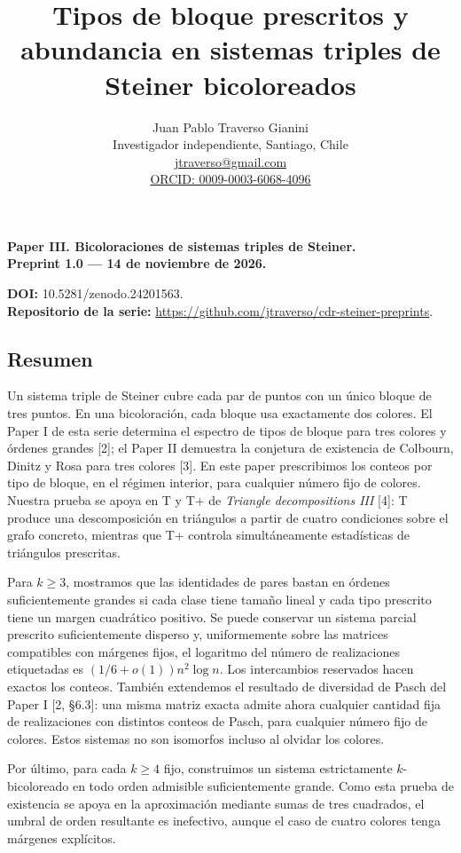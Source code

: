 \documentclass[spanish,11pt,a4paper]{article}
\title{Tipos de bloque prescritos y abundancia en sistemas triples de Steiner bicoloreados}
\author{Juan Pablo Traverso Gianini\\\small Investigador independiente, Santiago, Chile\\\small \href{mailto:jtraverso@gmail.com}{jtraverso@gmail.com}\\\small \href{https://orcid.org/0009-0003-6068-4096}{ORCID: 0009-0003-6068-4096}}
\date{}
\begin{document}
\raggedbottom\maketitle
\textbf{Paper III. Bicoloraciones de sistemas triples de Steiner.}\\
\textbf{Preprint 1.0 --- 14 de noviembre de 2026.}

\textbf{DOI:} 10.5281/zenodo.24201563.\\
\textbf{Repositorio de la serie:} \url{https://github.com/jtraverso/cdr-steiner-preprints}.

\subsection{Resumen}\label{resumen}

Un sistema triple de Steiner cubre cada par de puntos con un único bloque de tres puntos. En una bicoloración, cada bloque usa exactamente dos colores. El Paper I de esta serie determina el espectro de tipos de bloque para tres colores y órdenes grandes {[}2{]}; el Paper II demuestra la conjetura de existencia de Colbourn, Dinitz y Rosa para tres colores {[}3{]}. En este paper prescribimos los conteos por tipo de bloque, en el régimen interior, para cualquier número fijo de colores. Nuestra prueba se apoya en T y T+ de \emph{Triangle decompositions III} {[}4{]}: T produce una descomposición en triángulos a partir de cuatro condiciones sobre el grafo concreto, mientras que T+ controla simultáneamente estadísticas de triángulos prescritas.

Para \(k\ge3\), mostramos que las identidades de pares bastan en órdenes suficientemente grandes si cada clase tiene tamaño lineal y cada tipo prescrito tiene un margen cuadrático positivo. Se puede conservar un sistema parcial prescrito suficientemente disperso y, uniformemente sobre las matrices compatibles con márgenes fijos, el logaritmo del número de realizaciones etiquetadas es \((1/6+o(1))n^2\log n\). Los intercambios reservados hacen exactos los conteos. También extendemos el resultado de diversidad de Pasch del Paper I {[}2, §6.3{]}: una misma matriz exacta admite ahora cualquier cantidad fija de realizaciones con distintos conteos de Pasch, para cualquier número fijo de colores. Estos sistemas no son isomorfos incluso al olvidar los colores.

Por último, para cada \(k\ge4\) fijo, construimos un sistema estrictamente \(k\)-bicoloreado en todo orden admisible suficientemente grande. Como esta prueba de existencia se apoya en la aproximación mediante sumas de tres cuadrados, el umbral de orden resultante es inefectivo, aunque el caso de cuatro colores tenga márgenes explícitos.
\end{document}

